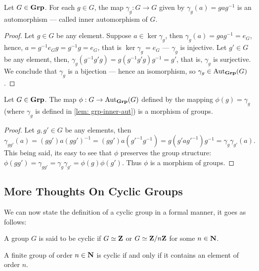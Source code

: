 \begin{lemma}\label{lem: grp-inner-aut}
Let \(G \in {\textbf{Grp}}\). For each \(g \in G\), the map \(\gamma_g: G \to G\) given
by \(\gamma_g(a) = gag^{-1}\) is an automorphism --- called inner
automorphism of \(G\).
\end{lemma}

\begin{proof}
Let \(g \in G\) be any element. Suppose \(a \in \ker\gamma_g\), then
\(\gamma_g(a) = gag^{-1} = e_G\), hence, \(a = g^{-1} e_G g = g^{-1}g = e_G\),
that is \(\ker\gamma_g = e_G\) --- \(\gamma_g\) is injective. Let \(g' \in G\)
be any element, then, \(\gamma_g(g^{-1} g' g) = g (g^{-1} g' g) g^{-1} = g'\),
that is, \(\gamma_g\) is surjective. We conclude that \(\gamma_g\) is a
bijection --- hence an isomorphism, so \(\gamma_g \in \operatorname{Aut}_{\textbf{Grp}}(G)\).
\end{proof}

\begin{lemma}\label{lem: grp-inner-aut-cor}
Let \(G \in {\textbf{Grp}}\). The map \(\phi: G \to \operatorname{Aut}_{\textbf{Grp}}(G)\) defined by the
mapping \(\phi(g) = \gamma_g\) (where \(\gamma_g\) is defined in \cref{lem:
grp-inner-aut}) is a morphism of groups.
\end{lemma}

\begin{proof}
Let \(g, g' \in G\) be any elements, then
\[
  \gamma_{gg'}(a) = (gg')a{(gg')}^{-1} = (g g') a (g'^{-1} g^{-1})
  = g(g' a g'^{-1}) g^{-1} = \gamma_g \gamma_{g'}(a).
\]
This being said, its easy to see that \(\phi\) preserves the group structure:
\(\phi(gg') = \gamma_{gg'} = \gamma_g \gamma_{g'} = \phi(g) \phi(g')\). Thus
\(\phi\) is a morphism of groups.
\end{proof}

\subsection{More Thoughts On Cyclic Groups}

We can now state the definition of a cyclic group in a formal manner, it goes as
follows:

\begin{definition}\label{def: cyclic-grp}
A group \(G\) is said to be cyclic if \(G \simeq \mathbf{Z}\) or \(G \simeq \mathbf{Z}/n\mathbf{Z}\) for
some \(n \in \mathbf{N}\).
\end{definition}

\begin{proposition}
A finite group of order \(n \in \mathbf{N}\) is cyclic if and only if it contains an
element of order \(n\).
\end{proposition}

